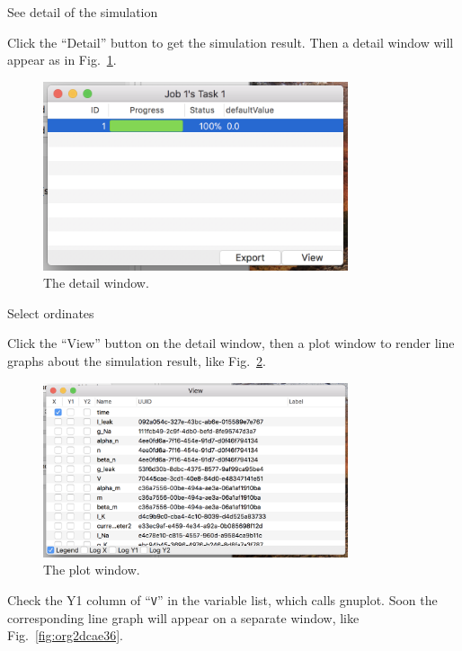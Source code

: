 \documentclass[a4paper,10pt]{report}
\begin{document}
\begin{description}
\item[{See detail of the simulation}] 
\end{description}
Click the ``Detail'' button to get the simulation result.
Then a detail window will appear as in Fig.~\ref{fig:orgee77659}.

\begin{figure}[htbp]
\centering
\includegraphics[width=0.8\textwidth]{image/hh-detail.png}
\caption{\label{fig:orgee77659}The detail window.}
\end{figure}

\begin{description}
\item[{Select ordinates}] 
\end{description}
Click the ``View'' button on the detail window, then a plot window to render
line graphs about the simulation result, like Fig.~\ref{fig:org1ad98e8}.

\begin{figure}[htbp]
\centering
\includegraphics[width=0.8\textwidth]{image/hh-plot.png}
\caption{\label{fig:org1ad98e8}The plot window.}
\end{figure}

Check the Y1 column of ``\texttt{V}'' in the variable list, which calls gnuplot.
Soon the corresponding line graph will appear on a separate window,
like Fig.~\ref{fig:org2dcae36}.
\end{document}
